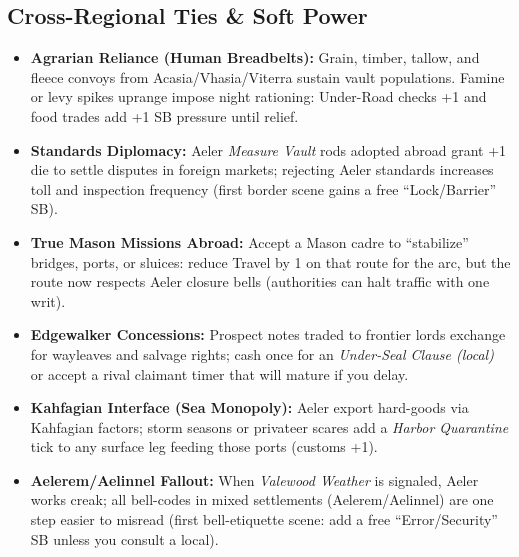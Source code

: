 \subsection*{Cross-Regional Ties \& Soft Power}
\begin{itemize}
  \item \textbf{Agrarian Reliance (Human Breadbelts):} Grain, timber, tallow, and fleece convoys from Acasia/Vhasia/Viterra sustain vault populations. Famine or levy spikes uprange impose night rationing: Under-Road checks +1 \DV{} and food trades add +1 SB pressure until relief.
  \item \textbf{Standards Diplomacy:} Aeler \emph{Measure Vault} rods adopted abroad grant +1 die to settle disputes in foreign markets; rejecting Aeler standards increases toll and inspection frequency (first border scene gains a free ``Lock/Barrier'' SB).
  \item \textbf{True Mason Missions Abroad:} Accept a Mason cadre to ``stabilize'' bridges, ports, or sluices: reduce Travel \DV{} by 1 on that route for the arc, but the route now respects Aeler closure bells (authorities can halt traffic with one writ).
  \item \textbf{Edgewalker Concessions:} Prospect notes traded to frontier lords exchange for wayleaves and salvage rights; cash once for an \emph{Under-Seal Clause (local)} or accept a rival claimant timer that will mature if you delay.
  \item \textbf{Kahfagian Interface (Sea Monopoly):} Aeler export hard-goods via Kahfagian factors; storm seasons or privateer scares add a \emph{Harbor Quarantine} tick to any surface leg feeding those ports (customs \DV{} +1).
  \item \textbf{Aelerem/Aelinnel Fallout:} When \emph{Valewood Weather} is signaled, Aeler works creak; all bell-codes in mixed settlements (Aelerem/Aelinnel) are one step easier to misread (first bell-etiquette scene: add a free ``Error/Security'' SB unless you consult a local).
\end{itemize}

